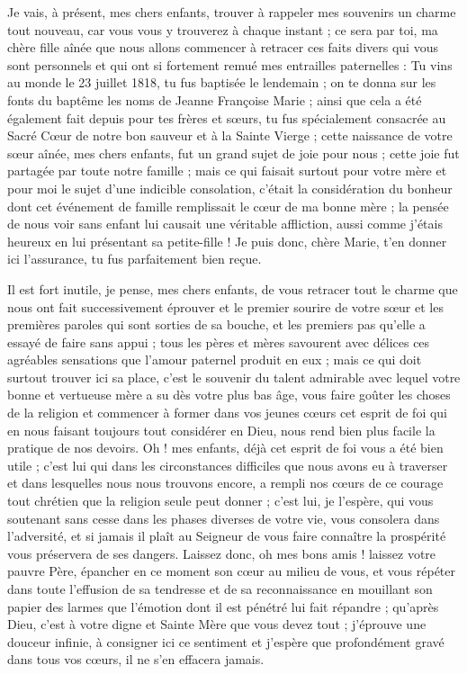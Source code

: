 \documentclass[11pt,a4paper]{report}
\begin{document}
Je vais, à présent, mes chers enfants, trouver à rappeler mes souvenirs un charme tout nouveau, car vous vous y trouverez à chaque instant ; ce sera par toi, ma chère fille aînée que nous allons commencer à retracer ces faits divers qui vous sont personnels et qui ont si fortement remué mes entrailles paternelles : Tu vins au monde le 23 juillet 1818, tu fus baptisée le lendemain ; on te donna sur les fonts du baptême les noms de Jeanne Françoise Marie ; ainsi que cela a été également fait depuis pour tes frères et sœurs, tu fus spécialement consacrée au Sacré Cœur de notre bon sauveur et à la Sainte Vierge ; cette naissance de votre sœur aînée, mes chers enfants, fut un grand sujet de joie pour nous ; cette joie fut partagée par toute notre famille ; mais ce qui faisait surtout pour votre mère et pour moi le sujet d'une indicible consolation, c'était la considération du bonheur dont cet événement de famille remplissait le cœur de ma bonne mère ; la pensée de nous voir sans enfant lui causait une véritable affliction, aussi comme j'étais heureux en lui présentant sa petite-fille ! Je puis donc, chère Marie, t'en donner ici l'assurance, tu fus parfaitement bien reçue.

Il est fort inutile, je pense, mes chers enfants, de vous retracer tout le charme que nous ont fait successivement éprouver et le premier sourire de votre sœur et les premières paroles qui sont sorties de sa bouche, et les premiers pas qu'elle a essayé de faire sans appui ; tous les pères et mères savourent avec délices ces agréables sensations que l'amour paternel produit en eux ; mais ce qui doit surtout trouver ici sa place, c'est le souvenir du talent admirable avec lequel votre bonne et vertueuse mère a su dès votre plus bas âge, vous faire goûter les choses de la religion et commencer à former dans vos jeunes cœurs cet esprit de foi qui en nous faisant toujours tout considérer en Dieu, nous rend bien plus facile la pratique de nos devoirs. Oh ! mes enfants, déjà cet esprit de foi vous a été bien utile ; c'est lui qui dans les circonstances difficiles que nous avons eu à traverser et dans lesquelles nous nous trouvons encore, a rempli nos cœurs de ce courage tout chrétien que la religion seule peut donner ; c'est lui, je l'espère, qui vous soutenant sans cesse dans les phases diverses de votre vie, vous consolera dans l'adversité, et si jamais il plaît au Seigneur de vous faire connaître la prospérité vous préservera de ses dangers. Laissez donc, oh mes bons amis ! laissez votre pauvre Père, épancher en ce moment son cœur au milieu de vous, et vous répéter dans toute l'effusion de sa tendresse et de sa reconnaissance en mouillant son papier des larmes que l'émotion dont il est pénétré lui fait répandre ; qu'après Dieu, c'est à votre digne et Sainte Mère que vous devez tout ; j'éprouve une douceur infinie, à consigner ici ce sentiment et j'espère que profondément gravé dans tous vos cœurs, il ne s'en effacera jamais.
\end{document}
